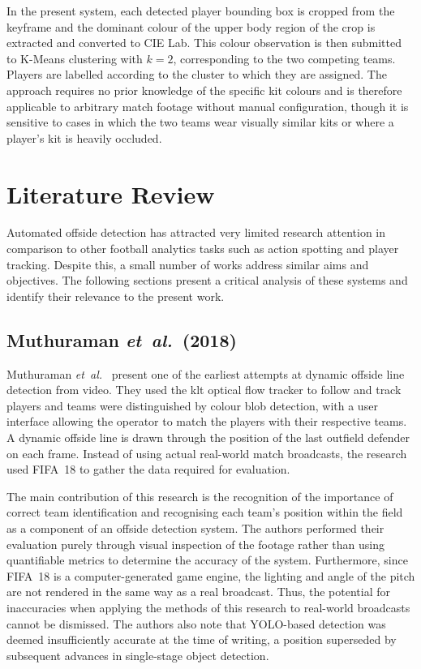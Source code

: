 In the present system, each detected player bounding box is cropped from the keyframe and the dominant colour of the upper body region of the crop is extracted and converted to CIE Lab. This colour observation is then submitted to K-Means clustering with $k = 2$, corresponding to the two competing teams. Players are labelled according to the cluster to which they are assigned. The approach requires no prior knowledge of the specific kit colours and is therefore applicable to arbitrary match footage without manual configuration, though it is sensitive to cases in which the two teams wear visually similar kits or where a player's kit is heavily occluded.

\section{Literature Review}%
\label{sec:lit_review}

Automated offside detection has attracted very limited research attention in comparison to other football analytics tasks such as action spotting and player tracking. Despite this, a small number of works address similar aims and objectives. The following sections present a critical analysis of these systems and identify their relevance to the present work.

\subsection{Muthuraman \textit{et~al.}\ (2018)}%
\label{sec:lit_muthuraman}

Muthuraman \textit{et~al.}~\cite{muthuraman2018vision} present one of the earliest attempts at dynamic offside line detection from video. They used the \gls{klt} optical flow tracker to follow and track players and teams were distinguished by colour blob detection, with a user interface allowing the operator to match the players with their respective teams. A dynamic offside line is drawn through the position of the last outfield defender on each frame. Instead of using actual real-world match broadcasts, the research used FIFA~18 to gather the data required for evaluation.

The main contribution of this research is the recognition of the importance of correct team identification and recognising each team's position within the field as a component of an offside detection system. The authors performed their evaluation purely through visual inspection of the footage rather than using quantifiable metrics to determine the accuracy of the system. Furthermore, since FIFA~18 is a computer-generated game engine, the lighting and angle of the pitch are not rendered in the same way as a real broadcast. Thus, the potential for inaccuracies when applying the methods of this research to real-world broadcasts cannot be dismissed. The authors also note that YOLO-based detection was deemed insufficiently accurate at the time of writing, a position superseded by subsequent advances in single-stage object detection. 

